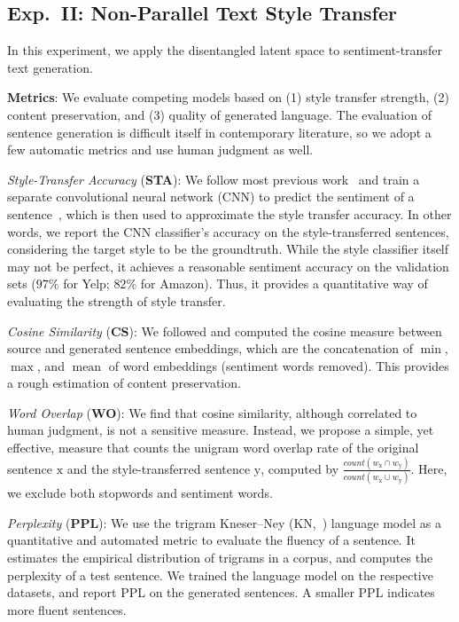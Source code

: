 \documentclass[11pt,a4paper]{article}
\begin{document}
\subsection{Exp.~II: Non-Parallel Text Style Transfer}
In this experiment, we apply the disentangled latent space to sentiment-transfer text generation.

\textbf{Metrics}: We evaluate competing models based on (1) style transfer strength, (2) content preservation, and (3) quality of generated language. The evaluation of sentence generation is difficult itself in contemporary literature, so we adopt a few automatic metrics and use human judgment as well.

\textit{Style-Transfer Accuracy} (\textbf{STA}):
We follow most previous work~\cite{hu2017toward,shen2017style,fu2018style} and train a separate convolutional neural network (CNN) to predict the sentiment of a sentence~\cite{kim2014convolutional}, which is then used to approximate the style transfer accuracy.
In other words, we report the CNN classifier's accuracy on the style-transferred sentences, considering the target style to be the groundtruth.
While the style classifier itself may not be perfect, it achieves a reasonable sentiment accuracy on the validation sets ($97\%$ for Yelp; $82\%$ for Amazon).
Thus, it provides a quantitative way of evaluating the strength of style transfer.

\textit{Cosine Similarity} (\textbf{CS}):
We followed \citet{fu2018style} and computed the cosine measure between source and generated sentence embeddings, which are the concatenation of $\operatorname{min}$, $\operatorname{max}$, and $\operatorname{mean}$ of word embeddings (sentiment words removed). This provides a rough estimation of content preservation.

\textit{Word Overlap} (\textbf{WO}):
We find that cosine similarity, although correlated to human judgment, is not a sensitive measure.
Instead, we propose a simple, yet effective, measure that counts the unigram word overlap rate of the original sentence $\mathrm x$ and the style-transferred sentence $\mathrm y$, computed by $\frac{count(w_{\mathrm x} \cap w_{\mathrm y})}{count(w_{\mathrm x} \cup w_{\mathrm y})}$.
Here, we exclude both stopwords and sentiment words.


\textit{Perplexity} (\textbf{PPL}): We use the trigram Kneser--Ney (KN,~\citeyear{kneser1995improved}) language model as a quantitative and automated metric to evaluate the fluency of a sentence.
It estimates the empirical distribution of trigrams in a corpus, and computes the perplexity of a test sentence.
We trained the language model on the respective datasets, and report PPL on the generated sentences. A smaller PPL indicates more fluent sentences.
\end{document}
